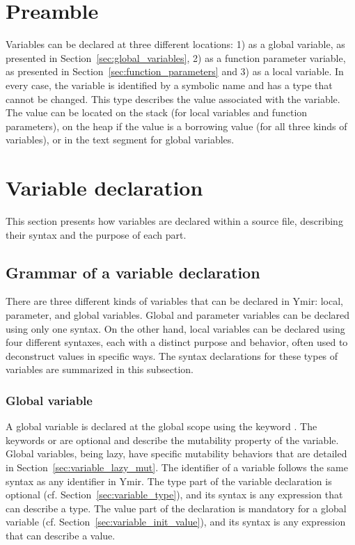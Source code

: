 \section{Preamble}

Variables can be declared at three different locations: 1) as a global variable,
as presented in Section~\ref{sec:global_variables}, 2) as a function parameter
variable, as presented in Section~\ref{sec:function_parameters} and 3) as a local
variable. In every case, the variable is identified by a symbolic name and has a
type that cannot be changed. This type describes the value associated with the
variable. The value can be located on the stack (for local variables and
function parameters), on the heap if the value is a borrowing value (for all
three kinds of variables), or in the text segment for global variables.

\section{Variable declaration}
\label{sec:local_variable_declaration}

This section presents how variables are declared within a source file,
describing their syntax and the purpose of each part.

\subsection{Grammar of a variable declaration}

There are three different kinds of variables that can be declared in Ymir:
local, parameter, and global variables. Global and parameter variables can be
declared using only one syntax. On the other hand, local variables can be
declared using four different syntaxes, each with a distinct purpose and
behavior, often used to deconstruct values in specific ways. The syntax
declarations for these types of variables are summarized in this subsection.

\subsubsection*{Global variable}

A global variable is declared at the global scope using the keyword
. The keywords  or  are optional and describe
the mutability property of the variable. Global variables, being lazy, have
specific mutability behaviors that are detailed in
Section~\ref{sec:variable_lazy_mut}. The identifier of a variable follows the
same syntax as any identifier in Ymir. The type part of the variable declaration
is optional (cf. Section~\ref{sec:variable_type}), and its syntax is any
expression that can describe a type. The value part of the declaration is
mandatory for a global variable (cf. Section~\ref{sec:variable_init_value}), and
its syntax is any expression that can describe a value.

